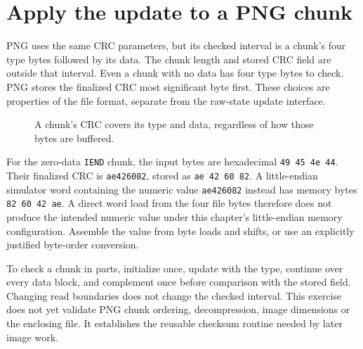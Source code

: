 \section{Apply the update to a PNG chunk}
PNG uses the same CRC parameters, but its checked interval is a chunk's four type bytes
followed by its data. The chunk length and stored CRC field are outside that interval.
Even a chunk with no data has four type bytes to check. PNG stores the finalized CRC
most significant byte first. These choices are properties of the file format, separate
from the raw-state update interface.

\begin{figure}[htbp]
\centering
{}
\caption{A chunk's CRC covers its type and data, regardless of how those bytes are buffered.}
\end{figure}

For the zero-data \texttt{IEND} chunk, the input bytes are hexadecimal
\texttt{49 45 4e 44}. Their finalized CRC is \texttt{ae426082}, stored as
\texttt{ae 42 60 82}. A little-endian simulator word containing the numeric value
\texttt{ae426082} instead has memory bytes \texttt{82 60 42 ae}. A direct word
load from the four file bytes therefore does not produce the intended numeric value
under this chapter's little-endian memory configuration. Assemble the value from byte
loads and shifts, or use an explicitly justified byte-order conversion.

To check a chunk in parts, initialize once, update with the type, continue over every
data block, and complement once before comparison with the stored field. Changing
read boundaries does not change the checked interval. This exercise does not yet
validate PNG chunk ordering, decompression, image dimensions or the enclosing file.
It establishes the reusable checksum routine needed by later image work.
